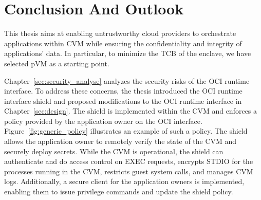 \chapter{Conclusion And Outlook}
\label{sec:conclusion}





This thesis aims at enabling untrustworthy cloud providers to orchestrate applications within \acrshort{CVM} while ensuring the confidentiality and integrity of applications' data. In particular, to minimize the \acrshort{TCB} of the enclave, we have selected \acrshort{pVM} as a starting point.
 
Chapter~\ref{sec:security_analyse} analyzes the security risks of the OCI runtime interface. To address these concerns, the thesis introduced the OCI runtime interface shield and proposed modifications to the OCI runtime interface in Chapter~\ref{sec:design}. The shield is implemented 
within the \acrshort{CVM} and enforces a policy provided by the application owner on the OCI interface. Figure~\ref{fig:generic_policy} illustrates an example of such a policy. The shield allows the application owner to remotely verify the state of the \acrshort{CVM} and securely deploy secrets. 
While the \acrshort{CVM} is operational, the shield can authenticate and do access control on EXEC requests, encrypts STDIO for the processes running in the \acrshort{CVM}, restricts guest system calls, and manages \acrshort{CVM} logs. Additionally, a secure client for the application owners is 
implemented, enabling them to issue privilege commands and update the shield policy.
 
